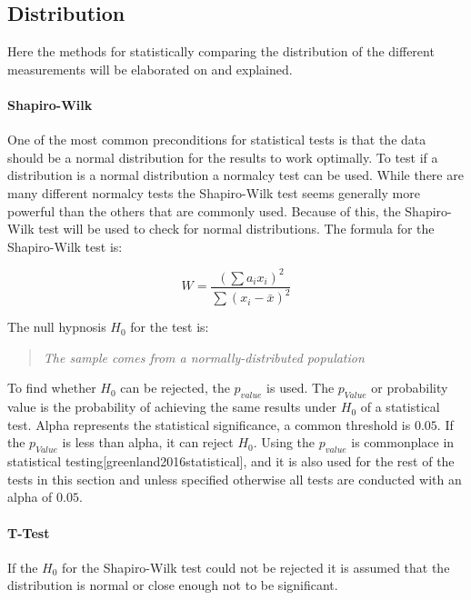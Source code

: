 \subsection{Distribution}
Here the methods for statistically comparing the distribution of the different measurements will be elaborated on and explained.

\paragraph{Shapiro-Wilk}
One of the most common preconditions for statistical tests is that the data should be a normal distribution for the results to work optimally. To test if a distribution is a normal distribution a normalcy test can be used. While there are many different normalcy tests the Shapiro-Wilk test seems generally more powerful than the others that are commonly used\cite{razali2011power}. Because of this, the Shapiro-Wilk test will be used to check for normal distributions. The formula for the Shapiro-Wilk test is:

\begin{equation}
    W=\frac{( \sum{a_i x_i} )^2}{\sum{(x_i - \bar{x})^2}}
\end{equation}

The null hypnosis $H_0$ for the test is:

\begin{quotation}
    \textit{The sample comes from a normally-distributed population}
\end{quotation}

To find whether $H_0$ can be rejected, the $p_{value}$ is used. The $p_{Value}$ or probability value is the probability of achieving the same results under $H_0$ of a statistical test. Alpha represents the statistical significance, a common threshold is $0.05$. If the $p_{Value}$ is less than alpha, it can reject $H_0$. Using the $p_{value}$ is commonplace in statistical testing[greenland2016statistical], and it is also used for the rest of the tests in this section and unless specified otherwise all tests are conducted with an alpha of $0.05$.

\paragraph{T-Test}

If the $H_0$ for the Shapiro-Wilk test could not be rejected it is assumed that the distribution is normal or close enough not to be significant.

